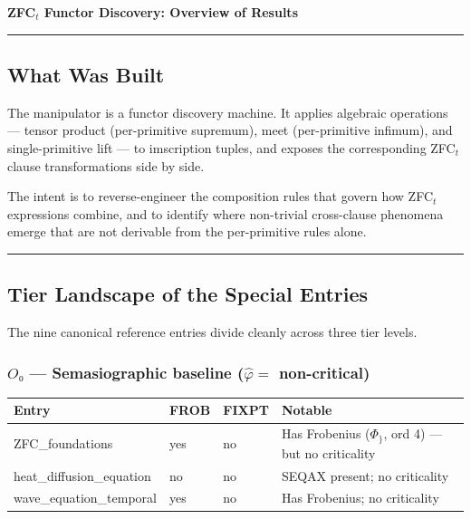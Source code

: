 \documentclass[12pt,a4paper]{article}
\begin{document}
\begin{center}
{\Large\bfseries ZFC$_t$ Functor Discovery: Overview of Results}

\rule{0.5\textwidth}{0.4pt}
\end{center}

\subsection*{What Was Built}

The manipulator is a functor discovery machine. It applies algebraic operations ---
tensor product (per-primitive supremum), meet (per-primitive infimum), and single-primitive lift ---
to imscription tuples, and exposes the corresponding ZFC$_t$ clause transformations side by side.

The intent is to reverse-engineer the composition rules that govern how ZFC$_t$ expressions combine, and to identify where non-trivial cross-clause phenomena emerge that are not derivable from the per-primitive rules alone.

\begin{center}
\rule{0.5\textwidth}{0.4pt}
\end{center}

\subsection*{Tier Landscape of the Special Entries}

The nine canonical reference entries divide cleanly across three tier levels.

\subsubsection*{$O₀$ --- Semasiographic baseline ($\hat{\varphi} =$ non-critical)}

\begin{table}[htbp]
\centering
\small

\begin{tabularx}{\textwidth}{>{\raggedright\arraybackslash}X >{\centering\arraybackslash}X >{\centering\arraybackslash}X >{\raggedright\arraybackslash}X}
\toprule
\textbf{Entry} & \textbf{FROB} & \textbf{FIXPT} & \textbf{Notable} \\
\midrule

ZFC\_foundations & yes & no & Has Frobenius ($\Phi_{\}}$, ord 4) --- but no criticality \\
heat\_diffusion\_equation & no & no & SEQAX present; no criticality \\
wave\_equation\_temporal & yes & no & Has Frobenius; no criticality \\
\bottomrule
\end{tabularx}
\end{table}
\end{document}
